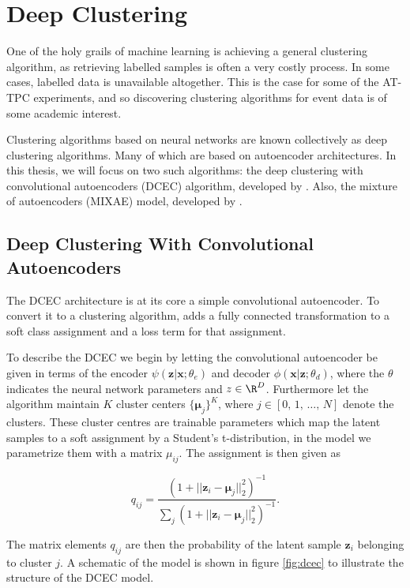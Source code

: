\section{Deep Clustering}\label{sec:deep_clustering}

One of the holy grails of machine learning is achieving a general clustering algorithm, as retrieving labelled samples is often a very costly process. In some cases, labelled data is unavailable altogether. This is the case for some of the AT-TPC experiments, and so discovering clustering algorithms for event data is of some academic interest. 

Clustering algorithms based on neural networks are known collectively as deep clustering algorithms. Many of which are based on autoencoder architectures. In this thesis, we will focus on two such algorithms: the deep clustering with convolutional autoencoders (DCEC) algorithm, developed by \citet{Guo2017}. Also, the mixture of autoencoders (MIXAE) model, developed by \cite{Zhang}. 

\subsection{Deep Clustering With Convolutional Autoencoders}

The DCEC architecture is at its core a simple convolutional autoencoder. To convert it to a clustering algorithm, \citet{Guo2017} adds a fully connected transformation to a soft class assignment and a loss term for that assignment. 

To describe the DCEC we begin by letting the convolutional autoencoder be given in terms of the encoder $\psi(\mathbf{z}|\mathbf{x} ; \theta_e)$ and decoder $\phi(\mathbf{x}|\mathbf{z}; \theta_d)$, where the $\theta$ indicates the neural network parameters and $z \in \R^D$. Furthermore let the algorithm maintain $K$ cluster centers $\{\mathbf{\mu}_j\}^K$, where $j \in [0,\, 1,\, \dots,\, N]$ denote the clusters. These cluster centres are trainable parameters which map the latent samples to a soft assignment by a Student's t-distribution, in the model we parametrize them with a matrix $\mu_{ij}$. The assignment is then given as 

\begin{equation}\label{eq:qij}
q_{ij} = \frac{(1 + ||\mathbf{z}_i - \mathbf{\mu}_j||^2_2)^{-1}}{\sum_j(1 + ||\mathbf{z}_i - \mathbf{\mu}_j||^2_2)^{-1}}.
\end{equation}

\noindent The matrix elements $q_{ij}$ are then the probability of the latent sample $\mathbf{z}_i$ belonging to cluster $j$. A schematic of the model is shown in figure \ref{fig:dcec} to illustrate the structure of the DCEC model. 

